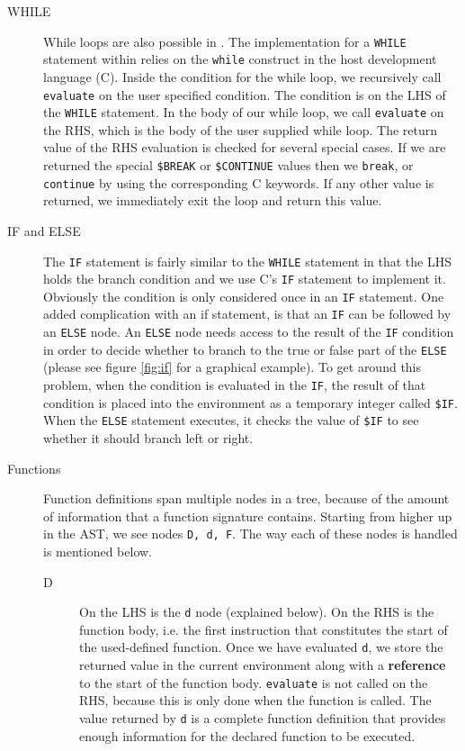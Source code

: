 \begin{description}
	\item[WHILE] While loops are also possible in \mmc. The implementation for a \verb!WHILE! statement within \mmc relies on the \verb!while! construct in the host development language (C). Inside the condition for the while loop, we recursively call \verb!evaluate! on the user specified condition. The condition is on the LHS of the \verb!WHILE! statement. In the body of our while loop, we call \verb!evaluate! on the RHS, which is the body of the user supplied while loop. The return value of the RHS evaluation is checked for several special cases. If we are returned the special \verb!$BREAK! or \verb!$CONTINUE! values then we \verb!break!, or \verb!continue! by using the  corresponding C keywords. If any other value is returned, we immediately exit the loop and return this value.
	\item[IF and ELSE] The \verb!IF! statement is fairly similar to the \verb!WHILE! statement in that the LHS holds the branch condition and we use C's \verb!IF! statement to implement it. Obviously the condition is only considered once in an \verb!IF! statement. One added complication with an if statement, is that an \verb!IF! can be followed by an \verb!ELSE! node. An \verb!ELSE! node needs access to the result of the \verb!IF! condition in order to decide whether to branch to the true or false part of the \verb!ELSE! (please see figure \ref{fig:if} for a graphical example). To get around this problem, when the condition is evaluated in the \verb!IF!, the result of that condition is placed into the environment as a temporary integer called \verb!$IF!. When the \verb!ELSE! statement executes, it checks the value of \verb!$IF! to see whether it should branch left or right.
	\item[Functions] Function definitions span multiple nodes in a tree, because of the amount of information that a function signature contains. Starting from higher up in the AST, we see nodes \verb!D, d, F!. The way each of these nodes is handled is mentioned below.
		\begin{description}
			\item[D] On the LHS is the \verb!d! node (explained below). On the RHS is the function body, i.e. the first instruction that constitutes the start of the used-defined function. Once we have evaluated \verb!d!, we store the returned value in the current environment along with a \textbf{reference} to the start of the function body. \verb!evaluate! is not called on the RHS, because this is only done when the function is called. The value returned by \verb!d! is a complete function definition that provides enough information for the declared function to be executed.

\end{description}
\end{description}
